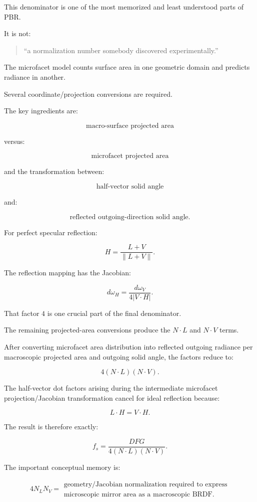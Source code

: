 This denominator is one of the most memorized and least understood parts of PBR.

It is not:

\begin{quote}
``a normalization number somebody discovered experimentally.''
\end{quote}

The microfacet model counts surface area in one geometric domain and predicts radiance in another.

Several coordinate/projection conversions are required.

The key ingredients are:

\[
\boxed{
\text{macro-surface projected area}
}
\]

versus:

\[
\boxed{
\text{microfacet projected area}
}
\]

and the transformation between:

\[
\boxed{
\text{half-vector solid angle}
}
\]

and:

\[
\boxed{
\text{reflected outgoing-direction solid angle}.
}
\]

For perfect specular reflection:

\[
H=
\frac{L+V}{\|L+V\|}.
\]

The reflection mapping has the Jacobian:

\[
\boxed{
d\omega_H
=
\frac{
d\omega_V
}{
4|V\cdot H|
}.
}
\]

That factor \(4\) is one crucial part of the final denominator.

The remaining projected-area conversions produce the \(N\cdot L\) and \(N\cdot V\) terms.

After converting microfacet area distribution into reflected outgoing radiance per macroscopic projected area and outgoing solid angle, the factors reduce to:

\[
\boxed{
4(N\cdot L)(N\cdot V)
}.
\]

The half-vector dot factors arising during the intermediate microfacet projection/Jacobian transformation cancel for ideal reflection because:

\[
L\cdot H=V\cdot H.
\]

The result is therefore exactly:

\[
f_s=
\frac{DFG}
{4(N\cdot L)(N\cdot V)}.
\]

The important conceptual memory is:

\[\boxed{4N_LN_V=\begin{gathered}\text{geometry/Jacobian normalization required to express}\\\text{microscopic mirror area as a macroscopic BRDF}.\end{gathered}}\]

